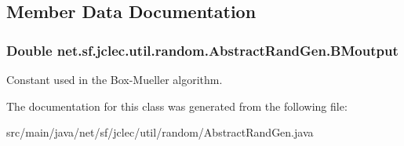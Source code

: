 \subsection{Member Data Documentation}
\hypertarget{classnet_1_1sf_1_1jclec_1_1util_1_1random_1_1_abstract_rand_gen_a3185942553b54d150bf1252fa0c03c7d}{
\subsubsection[{B\-Moutput}]{\setlength{\rightskip}{0pt plus 5cm}Double net.\-sf.\-jclec.\-util.\-random.\-Abstract\-Rand\-Gen.\-B\-Moutput\hspace{0.3cm}{\ttfamily [protected]}}}\label{classnet_1_1sf_1_1jclec_1_1util_1_1random_1_1_abstract_rand_gen_a3185942553b54d150bf1252fa0c03c7d}
Constant used in the Box-\/\-Mueller algorithm. 

The documentation for this class was generated from the following file\-:\begin{DoxyCompactItemize}
\item 
src/main/java/net/sf/jclec/util/random/Abstract\-Rand\-Gen.\-java\end{DoxyCompactItemize}
